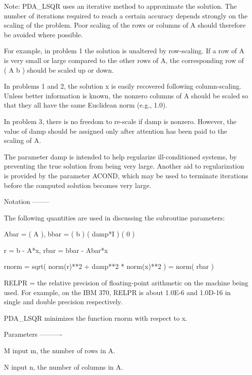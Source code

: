 \documentclass[11pt,twoside,nolof]{starlink}
\begin{document}
\begin{terminalv}
     Note:  PDA_LSQR uses an iterative method to approximate the solution.
     The number of iterations required to reach a certain accuracy
     depends strongly on the scaling of the problem.  Poor scaling of
     the rows or columns of A should therefore be avoided where
     possible.

     For example, in problem 1 the solution is unaltered by
     row-scaling.  If a row of A is very small or large compared to
     the other rows of A, the corresponding row of ( A  b ) should be
     scaled up or down.

     In problems 1 and 2, the solution x is easily recovered
     following column-scaling.  Unless better information is known,
     the nonzero columns of A should be scaled so that they all have
     the same Euclidean norm (e.g., 1.0).

     In problem 3, there is no freedom to re-scale if damp is
     nonzero.  However, the value of damp should be assigned only
     after attention has been paid to the scaling of A.

     The parameter damp is intended to help regularize
     ill-conditioned systems, by preventing the true solution from
     being very large.  Another aid to regularization is provided by
     the parameter ACOND, which may be used to terminate iterations
     before the computed solution becomes very large.


     Notation
     --------

     The following quantities are used in discussing the subroutine
     parameters:

     Abar   =  (   A    ),          bbar  =  ( b )
               ( damp*I )                    ( 0 )

     r      =  b  -  A*x,           rbar  =  bbar  -  Abar*x

     rnorm  =  sqrt( norm(r)**2  +  damp**2 * norm(x)**2 )
            =  norm( rbar )

     RELPR  =  the relative precision of floating-point arithmetic
               on the machine being used.  For example, on the IBM 370,
               RELPR is about 1.0E-6 and 1.0D-16 in single and double
               precision respectively.

     PDA_LSQR  minimizes the function rnorm with respect to x.


     Parameters
     ----------

     M       input      m, the number of rows in A.

     N       input      n, the number of columns in A.


\end{terminalv}
\end{document}
